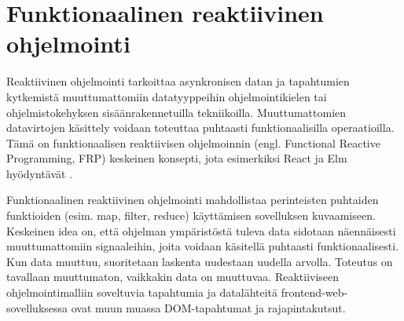 \section{Funktionaalinen reaktiivinen ohjelmointi}
Reaktiivinen ohjelmointi tarkoittaa asynkronisen datan ja tapahtumien kytkemistä muuttumattomiin datatyyppeihin
ohjelmointikielen tai ohjelmistokehyksen sisäänrakennetuilla tekniikoilla. Muuttumattomien datavirtojen käsittely
voidaan toteuttaa puhtaasti funktionaalisilla operaatioilla. Tämä on funktionaalisen reaktiivisen ohjelmoinnin (engl.
Functional Reactive Programming, FRP) keskeinen konsepti, jota esimerkiksi React ja Elm hyödyntävät
\cite{elmlang}\cite{reactjs}. \cite{fpmattered}

Funktionaalinen reaktiivinen ohjelmointi mahdollistaa perinteisten puhtaiden funktioiden (esim. map, filter, reduce)
käyttämisen sovelluksen kuvaamiseen. Keskeinen idea on, että ohjelman ympäristöstä tuleva data sidotaan näennäisesti
muuttumattomiin signaaleihin, joita voidaan käsitellä puhtaasti funktionaalisesti. Kun data muuttuu, suoritetaan
laskenta uudestaan uudella arvolla. Toteutus on tavallaan muuttumaton, vaikkakin data on muuttuvaa. Reaktiiviseen
ohjelmointimalliin soveltuvia tapahtumia ja datalähteitä frontend-web-sovelluksessa ovat muun muassa DOM-tapahtumat ja
rajapintakutsut. \cite{elmlang}